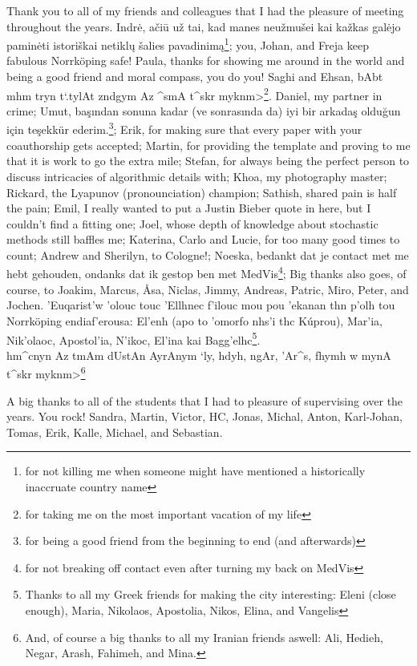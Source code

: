Thank you to all of my friends and colleagues that I had the pleasure of meeting throughout the years. Indr\.e, a\v{c}i\={u} u\v{z} tai, kad manes neu\v{z}mu\v{s}ei kai ka\v{z}kas gal\.{e}jo pamin\.{e}ti istori\v{s}kai netikl\k{u} \v{s}alies pavadinim\k{a}\footnote{for not killing me when someone might have mentioned a historically inaccruate country name}; you, Johan, and Freja keep fabulous Norrk\"oping safe! Paula, thanks for showing me around in the world and being a good friend and moral compass, you do you! Saghi and Ehsan, \<bAbt mhm tryn t`.tylAt zndgym Az ^smA t^skr myknm>\footnote{for taking me on the most important vacation of my life}. Daniel, my partner in crime; Umut, ba\c{s}{\i}ndan sonuna kadar (ve sonras{\i}nda da) iyi bir arkada\c{s} oldu\u{g}un i\c{c}in te\c{s}ekk\"ur ederim.\footnote{for being a good friend from the beginning to end (and afterwards)}; Erik, for making sure that every paper with your coauthorship gets accepted; Martin, for providing the template and proving to me that it is work to go the extra mile; Stefan, for always being the perfect person to discuss intricacies of algorithmic details with; Khoa, my photography master; Rickard, the Lyapunov (pronounciation) champion; Sathish, shared pain is half the pain; Emil, I really wanted to put a Justin Bieber quote in here, but I couldn't find a fitting one; Joel, whose depth of knowledge about stochastic methods still baffles me; Katerina, Carlo and Lucie, for too many good times to count; Andrew and Sherilyn, to Cologne!; Noeska, bedankt dat je contact met me hebt gehouden, ondanks dat ik gestop ben met MedVis\footnote{for not breaking off contact even after turning my back on MedVis}; Big thanks also goes, of course, to Joakim, Marcus, \AA sa, Niclas, Jimmy, Andreas, Patric, Miro, Peter, and Jochen. \textgreek{'Euqarist'w 'olouc touc 'Ellhnec f'ilouc mou pou 'ekanan thn p'olh tou} Norrk\"oping \textgreek{endiaf'erousa: El'enh (apo to 'omorfo nhs'i thc K\'uprou), Mar'ia, Nik'olaoc, Apostol'ia, N'ikoc, El'ina kai Bagg'elhc}\footnote{Thanks to all my Greek friends for making the city interesting: Eleni (close enough), Maria, Nikolaos, Apostolia, Nikos, Elina, and Vangelis}.\\ \<hm^cnyn Az tmAm dUstAn AyrAnym `ly, hdyh, ngAr, 'Ar^s, fhymh w mynA t^skr myknm>\footnote{And, of course a big thanks to all my Iranian friends aswell: Ali, Hedieh, Negar, Arash, Fahimeh, and Mina.}

A big thanks to all of the students that I had to pleasure of supervising over the years. You rock! Sandra, Martin, Victor, HC, Jonas, Michal, Anton, Karl-Johan, Tomas, Erik, Kalle, Michael, and Sebastian.

